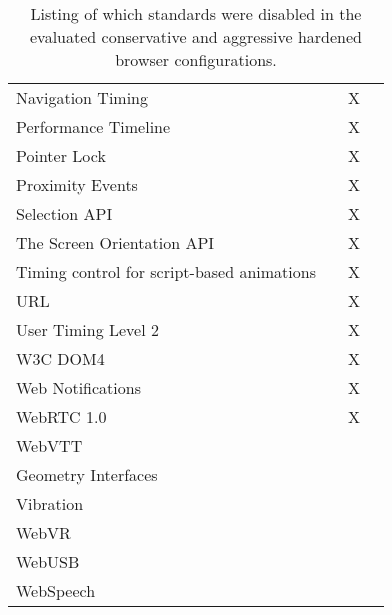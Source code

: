 \begin{table}[th]
{\begin{tabular}{ l | c c c }
          Navigation Timing                             &   & X \\ %
          Performance Timeline                          &   & X \\ %
          Pointer Lock                                  &   & X \\ %
          Proximity Events                              &   & X \\ %
          Selection API                                 &   & X \\ %
          The Screen Orientation API                    &   & X \\ %
          Timing control for script-based animations    &   & X \\ %
          URL                                           &   & X \\ %
          User Timing Level 2                           &   & X \\ %
          W3C DOM4                                      &   & X \\ %
          Web Notifications                             &   & X \\ %
          WebRTC 1.0                                    &   & X \\ %
          WebVTT                                        &   &   \\ %
          Geometry Interfaces                           &   &   \\ %
          Vibration                                     &   &   \\ %
          WebVR                                         &   &   \\ %
          WebUSB                                        &   &   \\ %
          WebSpeech                                     &   &   \\ %
        \bottomrule
      \end{tabular}
    }
    \caption{Listing of which standards were disabled in the evaluated
    conservative and aggressive hardened browser configurations.}
    \label{table:browser-configs}
  \end{table}
